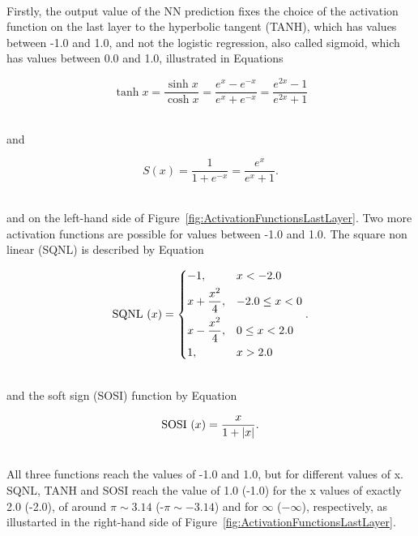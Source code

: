 \ \\Firstly, the output value of the NN prediction fixes the choice of the activation function on the last layer to the hyperbolic tangent (TANH), which has values between -1.0 and 1.0, and not the logistic regression, also called sigmoid, which has values between 0.0 and 1.0, illustrated in Equations

\begin{equation}
   \tanh x = \frac{\sinh x}{\cosh x} = \frac{e^x - e^{-x}}{e^x + e^{-x}} = \frac{e^{2x}-1}{e^{2x}+1}
\end{equation}

\ \\and

\begin{equation}
   S(x) = \frac{1}{1 + e^{-x}} = \frac{e^{x}}{e^{x}+1}.
\end{equation}

\ \\and on the left-hand side of Figure~\ref{fig:ActivationFunctionsLastLayer}. Two more activation functions are possible for values between -1.0 and 1.0. The square non linear (SQNL) is described by Equation

\begin{equation}
   \SQNL~(x) = 
\begin{dcases}
    -1 , & x < -2.0\\
    x + \frac{x^2}{4}, & -2.0 \leq x < 0\\
    x - \frac{x^2}{4}, & 0 \leq x < 2.0\\   
    1 , & x > 2.0\\
\end{dcases}.
\end{equation}

\ \\ and the soft sign (SOSI) function by Equation

\begin{equation}
   \SOSI~(x) = \frac{x}{1 + |x|}.
\end{equation}

\ \\All three functions reach the values of -1.0 and 1.0, but for different values of x. SQNL, TANH and SOSI reach the value of 1.0 (-1.0) for the x values of exactly 2.0 (-2.0), of around $\pi \sim 3.14$ (-$\pi \sim -3.14$) and for $\infty$ ($-\infty$), respectively, as illustarted in the right-hand side of Figure~\ref{fig:ActivationFunctionsLastLayer}.

